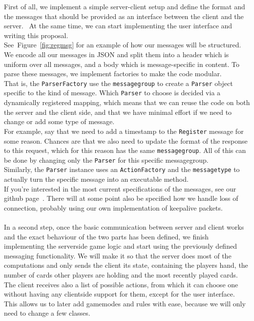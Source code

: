 \documentclass{report}
\newcommand{\rfig}[1]{Figure~\ref{fig:#1}}
\begin{document}
First of all, we implement a simple server-client setup and define the format and the messages that should be provided as an interface between the client and the server.~\cite{messaging} At the same time, we can start implementing the user interface and writing this proposal.\\
See~\rfig{regmsg} for an example of how our messages will be structured. We encode all our messages in JSON and split them into a header which is uniform over all messages, and a body which is message-specific in content. To parse these messages, we implement factories to make the code modular.\\
That is, the \verb|ParserFactory| use the \verb|messagegroup| to create a \verb|Parser| object specific to the kind of message. Which \verb|Parser| to choose is decided via a dynamically registered mapping, which means that we can reuse the code on both the server and the client side, and that we have minimal effort if we need to change or add some type of message.\\
For example, say that we need to add a timestamp to the \verb|Register| message for some reason. Chances are that we also need to update the format of the response to this request, which for this reason has the same \verb|messagegroup|. All of this can be done by changing only the \verb|Parser| for this specific messagegroup.\\
Similarly, the \verb|Parser| instance uses an \verb|ActionFactory| and the \verb|messagetype| to actually turn the specific message into an executable method.\\
If you're interested in the most current specifications of the messages, see our github page~\cite{github}. There will at some point also be specified how we handle loss of connection, probably using our own implementation of keepalive packets.\\
\\
In a second step, once the basic communication between server and client works and the exact behaviour of the two parts has been defined, we finish implementing the serverside game logic and start using the previously defined messaging functionality.
We will make it so that the server does most of the computations and only sends the client its state, containing the players hand, the number of cards other players are holding and the most recently played cards. The client receives also a list of possible actions, from which it can choose one without having any clientside support for them, except for the user interface. This allows us to later add gamemodes and rules with ease, because we will only need to change a few classes.\\
\end{document}
